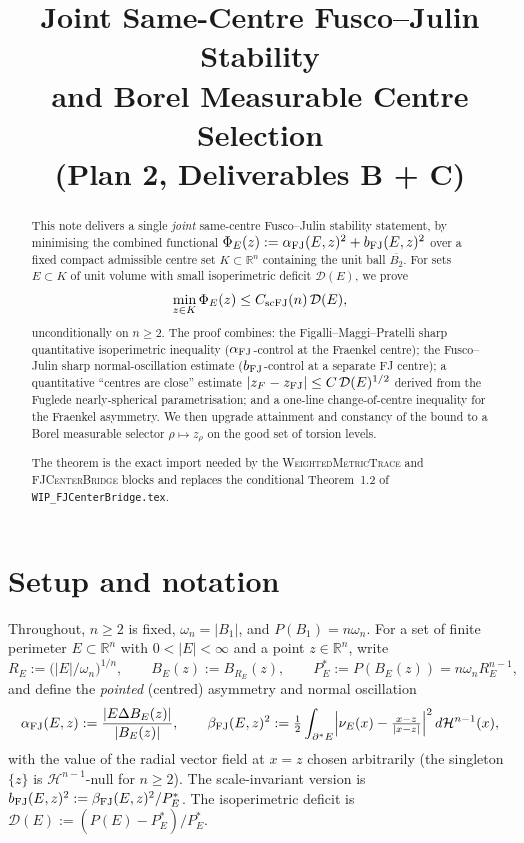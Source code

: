 \documentclass[11pt]{article}
\title{Joint Same-Centre Fusco--Julin Stability\\
       and Borel Measurable Centre Selection\\
       (Plan 2, Deliverables B + C)}
\author{}
\date{}
\theoremstyle{definition}
\newcommand{\R}{\mathbb{R}}
\newcommand{\Hn}{\mathcal H^{n-1}}
\newcommand{\dD}{\mathcal D}
\newcommand{\alphaFJ}{\alpha_{\rm FJ}}
\newcommand{\bFJ}{b_{\rm FJ}}
\newcommand{\betaFJ}{\beta_{\rm FJ}}
\newcommand{\scFJ}{{\rm scFJ}}
\begin{document}
\maketitle

\begin{abstract}
This note delivers a single \emph{joint} same-centre Fusco--Julin
stability statement, by minimising the combined functional
\(\Phi_E(z):=\alphaFJ(E,z)^{2}+\bFJ(E,z)^{2}\) over a fixed compact
admissible centre set \(K\subset\R^{n}\) containing the unit ball
\(\overline{B_{2}}\).  For sets \(E\subset K\) of unit volume with
small isoperimetric deficit \(\dD(E)\), we prove
\[
   \min_{z\in K}\Phi_E(z)\le C_{\scFJ}(n)\,\dD(E),
\]
unconditionally on \(n\ge2\).  The proof combines:
the Figalli--Maggi--Pratelli sharp quantitative isoperimetric
inequality (\(\alphaFJ\)-control at the Fraenkel centre); the
Fusco--Julin sharp normal-oscillation estimate
(\(\bFJ\)-control at a separate FJ centre); a quantitative
``centres are close'' estimate
\(|z_{F}-z_{\rm FJ}|\le C\,\dD(E)^{1/2}\) derived from the Fuglede
nearly-spherical parametrisation; and a one-line change-of-centre
inequality for the Fraenkel asymmetry.  We then upgrade attainment
and constancy of the bound to a Borel measurable selector
\(\rho\mapsto z_{\rho}\) on the good set of torsion levels.

The theorem is the exact import needed by the
\textsc{WeightedMetricTrace} and \textsc{FJCenterBridge} blocks and
replaces the conditional Theorem~1.2 of
\texttt{WIP\_FJCenterBridge.tex}.
\end{abstract}

\section{Setup and notation}\label{sec:setup}

Throughout, \(n\ge2\) is fixed, \(\omega_n=|B_1|\), and
\(P(B_1)=n\omega_n\).  For a set of finite perimeter \(E\subset\R^n\)
with \(0<|E|<\infty\) and a point \(z\in\R^n\), write
\[
   R_E:=\bigl(|E|/\omega_n\bigr)^{1/n},\qquad
   B_E(z):=B_{R_E}(z),\qquad
   P_E^{\ast}:=P(B_E(z))=n\omega_n R_E^{n-1},
\]
and define the \emph{pointed} (centred) asymmetry and normal
oscillation
\[
   \alphaFJ(E,z):=\frac{|E\Delta B_E(z)|}{|B_E(z)|},
   \qquad
   \betaFJ(E,z)^{2}:=\tfrac12\int_{\partial^{\ast}E}
      \Bigl|\nu_E(x)-\tfrac{x-z}{|x-z|}\Bigr|^{2}\,d\Hn(x),
\]
with the value of the radial vector field at \(x=z\) chosen
arbitrarily (the singleton \(\{z\}\) is \(\Hn\)-null for \(n\ge2\)).
The scale-invariant version is
\(\bFJ(E,z)^{2}:=\betaFJ(E,z)^{2}/P_E^{\ast}\).  The isoperimetric
deficit is \(\dD(E):=(P(E)-P_E^{\ast})/P_E^{\ast}\).
\end{document}
